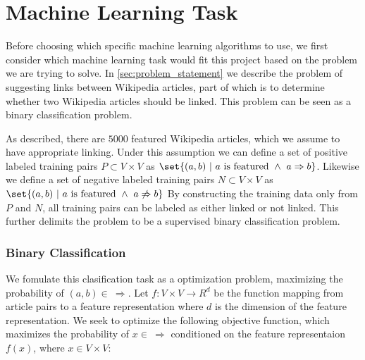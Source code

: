 

\section{Machine Learning Task}\label{sec:machine_learning_task}
Before choosing which specific machine learning algorithms to use, we first consider which machine learning task would fit this project based on the problem we are trying to solve. In \cref{sec:problem_statement} we describe the problem of suggesting links between Wikipedia articles, part of which is to determine whether two Wikipedia articles should be linked. This problem can be seen as a binary classification problem.

As described, there are $5000$ featured Wikipedia articles, which we assume to have appropriate linking. Under this assumption we can define a set of positive labeled training pairs $P \subset V \times V$ as $\set{(a,b)\ |\ a\text{ is featured}\ \wedge\ a \Rightarrow b}$. Likewise we define a set of negative labeled training pairs $N \subset V \times V$ as $\set{(a,b)\ |\ a\text{ is featured}\ \wedge\ a \not\Rightarrow b}$
By constructing the training data only from $P$ and $N$, all training pairs can be labeled as either linked or not linked.  This further delimits the problem to be a supervised binary classification problem.
 
\subsubsection{Binary Classification}

We fomulate this clasification task as a optimization problem, maximizing the probability of $(a,b) \in \ \Rightarrow$. Let $f: V\times V \to R^d$ be the function mapping from article pairs to a feature representation where $d$ is the dimension of the feature representation.
We seek to optimize the following objective function, which maximizes the probability of $x \in \ \Rightarrow$ conditioned on the feature representaion $f(x)$, where $x \in V \times V$:

